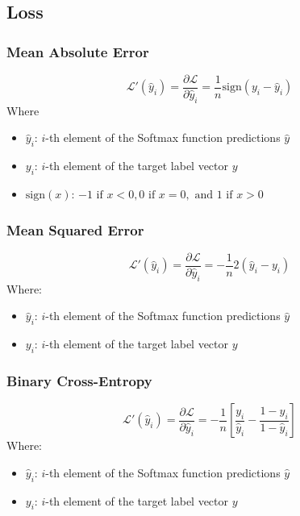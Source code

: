 \documentclass[a4paper]{report}
\newcommand{\haty}{\hat{y}}
\newcommand{\ELL}{\mathcal{L}}
\begin{document}
\subsection{Loss}
\subsubsection*{Mean Absolute Error}
\begin{equation*}
    \ELL'(\haty_i) = \frac{\partial\ELL}{\partial \haty_i} = \frac{1}{n}\text{sign}(y_i-\haty_i)
\end{equation*}
Where 
\begin{itemize}
    \item $\haty_i$: $i$-th element of the Softmax function predictions $\haty$
    \item $y_i$: $i$-th element of the target label vector $y$
    \item $\text{sign}(x)$: $-1 \text{ if } x < 0, 0 \text{ if } x = 0, \text{ and } 1 \text{ if } x > 0$
\end{itemize}

\subsubsection*{Mean Squared Error}
\begin{equation*}
    \ELL'(\haty_i) = \frac{\partial\ELL}{\partial \haty_i} = -\frac{1}{n}2(\haty_i-y_i)
\end{equation*}
Where:
\begin{itemize}
    \item $\haty_i$: $i$-th element of the Softmax function predictions $\haty$
    \item $y_i$: $i$-th element of the target label vector $y$
\end{itemize}

\subsubsection*{Binary Cross-Entropy}
\begin{equation*}
    \ELL'(\haty_i) = \frac{\partial\ELL}{\partial \haty_i} = -\frac{1}{n}\left[ \frac{y_i}{\haty_i} - \frac{1-y_i}{1-\haty_i} \right]
\end{equation*}
Where:
\begin{itemize}
    \item $\haty_i$: $i$-th element of the Softmax function predictions $\haty$
    \item $y_i$: $i$-th element of the target label vector $y$
\end{itemize}
\end{document}
